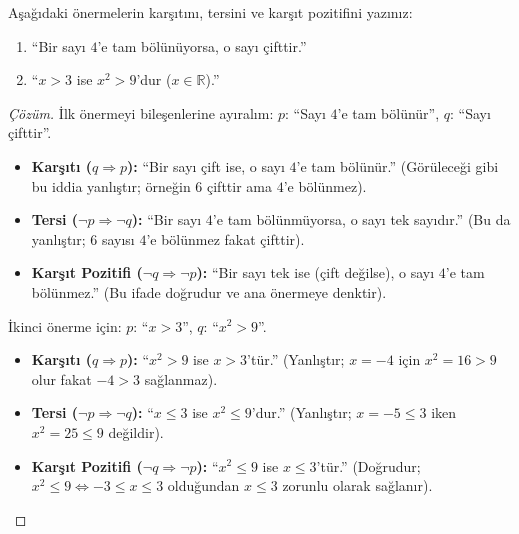 \begin{example}
Aşağıdaki önermelerin karşıtını, tersini ve karşıt pozitifini yazınız:
\begin{enumerate}
  \item ``Bir sayı $4$'e tam bölünüyorsa, o sayı çifttir.''
  \item ``$x > 3$ ise $x^2 > 9$'dur ($x \in \mathbb{R}$).''
\end{enumerate}
\end{example}
\begin{proof}[Çözüm]
İlk önermeyi bileşenlerine ayıralım:
$p$: ``Sayı $4$'e tam bölünür'', $q$: ``Sayı çifttir''.
\begin{itemize}
  \item \textbf{Karşıtı ($q \Rightarrow p$):} ``Bir sayı çift ise, o sayı $4$'e tam bölünür.'' (Görüleceği gibi bu iddia yanlıştır; örneğin $6$ çifttir ama $4$'e bölünmez).
  \item \textbf{Tersi ($\neg p \Rightarrow \neg q$):} ``Bir sayı $4$'e tam bölünmüyorsa, o sayı tek sayıdır.'' (Bu da yanlıştır; $6$ sayısı $4$'e bölünmez fakat çifttir).
  \item \textbf{Karşıt Pozitifi ($\neg q \Rightarrow \neg p$):} ``Bir sayı tek ise (çift değilse), o sayı $4$'e tam bölünmez.'' (Bu ifade doğrudur ve ana önermeye denktir).
\end{itemize}

İkinci önerme için:
$p$: ``$x > 3$'', $q$: ``$x^2 > 9$''.
\begin{itemize}
  \item \textbf{Karşıtı ($q \Rightarrow p$):} ``$x^2 > 9$ ise $x > 3$'tür.'' (Yanlıştır; $x = -4$ için $x^2 = 16 > 9$ olur fakat $-4 > 3$ sağlanmaz).
  \item \textbf{Tersi ($\neg p \Rightarrow \neg q$):} ``$x \le 3$ ise $x^2 \le 9$'dur.'' (Yanlıştır; $x = -5 \le 3$ iken $x^2 = 25 \le 9$ değildir).
  \item \textbf{Karşıt Pozitifi ($\neg q \Rightarrow \neg p$):} ``$x^2 \le 9$ ise $x \le 3$'tür.'' (Doğrudur; $x^2 \le 9 \iff -3 \le x \le 3$ olduğundan $x \le 3$ zorunlu olarak sağlanır).
\end{itemize}
\end{proof}

